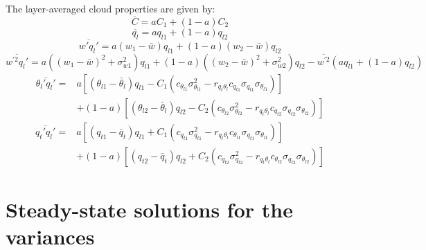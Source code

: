 \documentclass[11pt,fleqn]{article}
\begin{document}
The layer-averaged cloud properties are given by:
%
\begin{equation}
\overline{C} = a C_1 + (1-a) C_2
\end{equation}
%
\begin{equation}
\overline{q_l} = a q_{l1} + (1-a) q_{l2}
\end{equation}
%
\begin{equation}
\overline{w'q_l'} = a (w_1-\bar{w}) q_{l1} + (1-a) (w_2-\bar{w}) q_{l2}
\end{equation}
%
\begin{equation}
\overline{w^{'2}q_l'} 
= a \left( (w_1-\bar{w})^2 + \sigma_{w1}^2 \right) q_{l1} 
+ (1-a) \left( (w_2-\bar{w})^2 + \sigma_{w2}^2 \right) q_{l2}
- \overline{w^{'2}} \left( a q_{l1} + (1-a) q_{l2} \right)
\end{equation}
%
\begin{equation}
\begin{split}
\overline{\theta_l'q_l'}
=& a \left[ 
       (\theta_{l1} - \bar{\theta}_l ) q_{l1} 
       - C_1 
         \left( 
           c_{\theta_{l1}} \sigma_{\theta_{l1}}^2
           - r_{q_t \theta_l} c_{q_{t1}} \sigma_{q_{t1}} \sigma_{\theta_{l1}}
         \right)
     \right] \\
&+ (1-a) \left[ 
           (\theta_{l2} - \bar{\theta}_l ) q_{l2} 
           - C_2
             \left( 
               c_{\theta_{l2}} \sigma_{\theta_{l2}}^2
               - r_{q_t \theta_l} c_{q_{t2}} \sigma_{q_{t2}} \sigma_{\theta_{l2}}
             \right)
         \right]
\end{split}
\end{equation}
%
\begin{equation}
\begin{split}
\overline{q_t'q_l'}
=& a 
   \left[ 
     (q_{t1} - \bar{q}_t ) q_{l1} 
     + C_1
       \left(
         c_{q_{t1}} \sigma_{q_{t1}}^2
         - r_{q_t \theta_l} c_{\theta_{l1}} \sigma_{q_{t1}} \sigma_{\theta_{l1}}
       \right)
   \right]\\
&+ (1-a) 
   \left[ 
     (q_{t2} - \bar{q}_t ) q_{l2} 
     + C_2
       \left(
         c_{q_{t2}} \sigma_{q_{t2}}^2
         - r_{q_t \theta_l} c_{\theta_{l2}} \sigma_{q_{t2}} \sigma_{\theta_{l2}}
       \right)
   \right]
\end{split}
\end{equation}

\section{Steady-state solutions for the variances}
\end{document}
